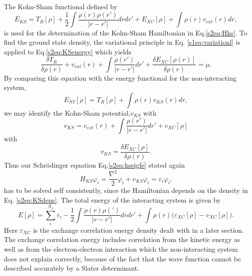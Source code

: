 \documentclass[a4paper,10pt,english]{article}%
\begin{document}
The Kohn-Sham functional defined by
\begin{equation}
	E_{KS}=T_R[\rho]+\frac{1}{2}\int\frac{\rho(r)\rho(r')}{|r-r'|}drdr'+E_{XC}[\rho]+\int\rho(r)v_{ext}(r)dr,
  \label{s2eq:KSenergy}
\end{equation}
is used for the determination of the Kohn-Sham Hamiltonian in Eq.\eqref{s2eq:Hks}.
To find the ground state density, the variational principle in Eq. \eqref{s1eq:variationl} is applied to Eq.\eqref{s2eq:KSenergy} which yields
\begin{equation}
  \frac{\delta T_R}{\delta \rho(r)}+v_{ext}(r)+\int\frac{\rho(r')}{|r-r'|}dr'+\frac{\delta E_{XC}[\rho(r)]}{\delta\rho(r)}=\mu.
  \label{s2eq:varappl}
\end{equation}
By comparing this equation with the energy functional for the non-interacting
system, 
\begin{equation}
  E_{NI}[\rho]=T_R[\rho]+\int\rho(r)v_{KS}(r)dr,
  \label{s2eq:noninterfunc}
\end{equation}
we may identify the Kohn-Sham potential,$v_{KS}$ with
\begin{equation}
  v_{KS}=v_{ext}(r)+\int\frac{\rho(r')}{|r-r'|}dr'+v_{XC}[\rho]
  \label{s2eq:vKS}
\end{equation}
with 
\begin{equation}
  v_{KS}=\frac{\delta E_{XC}[\rho]}{\delta \rho(r)}.
  \label{s2eq:vXC}
\end{equation}
Thus our Schr\"odinger equation Eq.\eqref{s2eq:kseigfe} stated again
\begin{equation*}
  H_{KS}\varphi_i=\frac{\nabla^2}{2}\varphi_i+v_{KS}\varphi_i=\varepsilon_i\varphi_i.
\end{equation*}
has to be solved self consistently, since the Hamiltonian depends on the density in Eq. \eqref{s2eq:KSdens}. The total energy of the interacting system is given by
\begin{equation}
  E[\rho]=\sum_i^{N_s}\varepsilon_i-\frac{1}{2}\int\frac{\rho(r)\rho(')}{|r-r'|}drdr'+\int\rho(r)\big(\varepsilon_{XC}[\rho]-v_{XC}[\rho]\big).
  \label{s2eq:totalenergy}
\end{equation}
Here $\varepsilon_{XC}$ is the exchange correlation energy density dealt with in a later section. The exchange correlation energy includes correlation from
the kinetic energy as well as from the electron-electron interaction which the
non-interacting system does not explain correctly, because of the fact that
the wave function cannot be described accurately by a Slater determinant.





\end{document}
